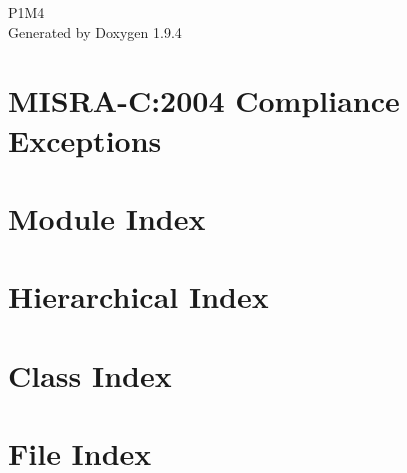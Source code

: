 \documentclass[twoside]{book}
\newcommand{\+}{\discretionary{\mbox{\scriptsize$\hookleftarrow$}}{}{}}
\newcommand{\clearemptydoublepage}{%
    \newpage{\pagestyle{empty}\cleardoublepage}%
  }
\begin{document}
  \raggedbottom
    \hypersetup{pageanchor=false,
                bookmarksnumbered=true,
                pdfencoding=unicode
               }
  \begin{titlepage}
  \vspace*{7cm}
  \begin{center}%
  {\Large P1\+M4}\\
  \vspace*{1cm}
  {\large Generated by Doxygen 1.9.4}\\
  \end{center}
  \end{titlepage}
  \clearemptydoublepage
  \tableofcontents
  \clearemptydoublepage
  \hypersetup{pageanchor=true}
\chapter{MISRA-\/C\+:2004 Compliance Exceptions}
\label{_c_m_s_i_s__m_i_s_r_a__exceptions}

\chapter{Module Index}

\chapter{Hierarchical Index}

\chapter{Class Index}

\chapter{File Index}

\end{document}
